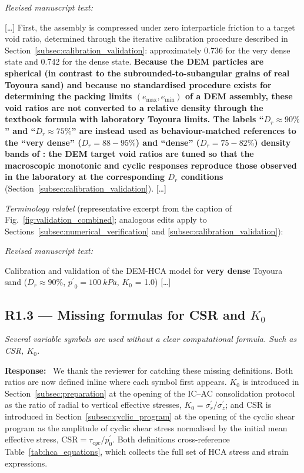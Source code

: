 \documentclass[11pt,a4paper]{article}
\newenvironment{rcomment}
  {\begin{leftbar}\color{black!75}\itshape}
  {\end{leftbar}\vspace{0.3em}}
\newcommand{\response}{\par\noindent\textbf{Response:}\ \ignorespaces}
\newenvironment{revtext}
  {\par\vspace{0.2em}\noindent\textit{Revised manuscript text:}\par
   \begingroup\color{black}\begin{leftbar}\small}
  {\end{leftbar}\endgroup\vspace{0.3em}}
\newcommand{\Kzero}{\ensuremath{K_0}}
\newcommand{\pmean}{\ensuremath{p^{\prime}}}
\begin{document}
\begin{revtext}
[\ldots] First, the assembly is compressed under zero interparticle
friction to a target void ratio, determined through the iterative
calibration procedure described in
Section~\ref{subsec:calibration_validation}: approximately 0.736 for
the very dense state and 0.742 for the dense state.
\textbf{Because the DEM particles are spherical (in contrast to the
subrounded-to-subangular grains of real Toyoura sand) and because no
standardised procedure exists for determining the packing limits
$(e_{\max}, e_{\min})$ of a DEM assembly, these void ratios are not
converted to a relative density through the textbook formula with
laboratory Toyoura limits. The labels ``$D_r \approx 90\%$'' and
``$D_r \approx 75\%$'' are instead used as behaviour-matched
references to the ``very dense'' ($D_r = 88\!-\!95\%$) and ``dense''
($D_r = 75\!-\!82\%$) density bands of \citet{Ishihara1985}: the DEM
target void ratios are tuned so that the macroscopic monotonic and
cyclic responses reproduce those observed in the laboratory at the
corresponding $D_r$ conditions} (Section~\ref{subsec:calibration_validation}).
[\ldots]
\end{revtext}

\noindent\emph{Terminology relabel} (representative excerpt from the
caption of Fig.~\ref{fig:validation_combined}; analogous edits apply
to Sections~\ref{subsec:numerical_verification} and
\ref{subsec:calibration_validation}):
\begin{revtext}
Calibration and validation of the DEM-HCA model for \textbf{very
dense} Toyoura sand ($D_r \approx 90\%$, $\pmean_0=\SI{100}{kPa}$,
\Kzero{} = 1.0) [\ldots]
\end{revtext}

\subsection*{R1.3 --- Missing formulas for CSR and $\Kzero$}

\begin{rcomment}
Several variable symbols are used without a clear computational formula.
Such as CSR, $\Kzero$.
\end{rcomment}

\response
We thank the reviewer for catching these missing definitions. Both
ratios are now defined inline where each symbol first appears.
$\Kzero$ is introduced in Section~\ref{subsec:preparation} at the
opening of the IC--AC consolidation protocol as the ratio of radial
to vertical effective stresses,
$\Kzero = \sigma_r^{\prime}/\sigma_z^{\prime}$; and CSR is introduced
in Section~\ref{subsec:cyclic_program} at the opening of the cyclic
shear program as the amplitude of cyclic shear stress normalised by
the initial mean effective stress,
$\mathrm{CSR} = \tau_{cyc}/p_0^{\prime}$. Both definitions
cross-reference Table~\ref{tab:hca_equations}, which collects the
full set of HCA stress and strain expressions.
\end{document}
